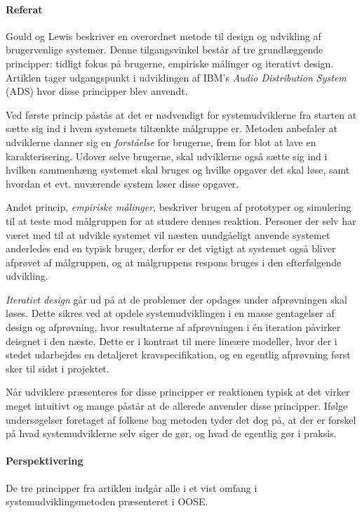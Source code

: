\documentclass[11pt, a4paper]{article}
\begin{document}
\paragraph{Referat}
Gould og Lewis\cite{gould1985designing} beskriver en overordnet metode til design og udvikling af brugervenlige systemer. Denne tilgangsvinkel består af tre grundlæggende principper: tidligt fokus på brugerne, empiriske målinger og iterativt design. Artiklen tager udgangspunkt i udviklingen af IBM's \emph{Audio Distribution System} (ADS) hvor disse principper blev anvendt.

Ved første princip påstås at det er nødvendigt for systemudviklerne fra starten at sætte sig ind i hvem systemets tiltænkte målgruppe er. Metoden anbefaler at udviklerne danner sig en \emph{forståelse} for brugerne, frem for blot at lave en karakterisering. Udover selve brugerne, skal udviklerne også sætte sig ind i hvilken sammenhæng systemet skal bruges og hvilke opgaver det skal løse, samt hvordan et evt. nuværende system løser disse opgaver.

Andet princip, \emph{empiriske målinger}, beskriver brugen af prototyper og simulering til at teste mod målgruppen for at studere dennes reaktion. Personer der selv har været med til at udvikle systemet vil næsten uundgåeligt anvende systemet anderledes end en typisk bruger, derfor er det vigtigt at systemet også bliver afprøvet af målgruppen, og at målgruppens respons bruges i den efterfølgende udvikling.

\emph{Iterativt design} går ud på at de problemer der opdages under afprøvningen skal løses. Dette sikres ved at opdele systemudviklingen i en masse gentagelser af design og afprøvning, hvor resultaterne af afprøvningen i én iteration påvirker deisgnet i den næste. Dette er i kontrast til mere lineære modeller, hvor der i stedet udarbejdes en detaljeret kravspecifikation, og en egentlig afprøvning først sker til sidst i projektet.

Når udviklere præsenteres for disse principper er reaktionen typisk at det virker meget intuitivt og mange påstår at de allerede anvender disse principper. Ifølge undersøgelser foretaget af folkene bag metoden tyder det dog på, at der er forskel på hvad systemudviklerne selv siger de gør, og hvad de egentlig gør i praksis.

\paragraph{Perspektivering}
De tre principper fra artiklen indgår alle i et vist omfang i systemudviklingsmetoden præsenteret i OOSE.
\end{document}
